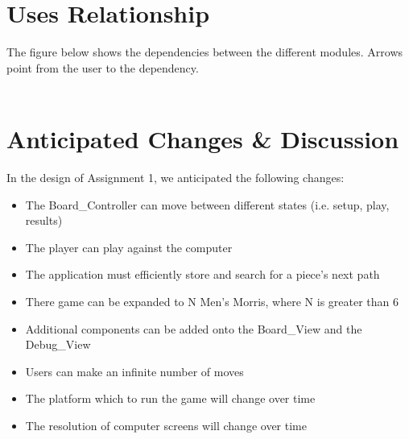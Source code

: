 \documentclass{article}
\begin{document}
{\section{Uses Relationship}
The figure below shows the dependencies between the different modules. Arrows point from the user to the dependency.
\\
\\
\begin{minipage}{\linewidth}
\end{minipage}

\section{Anticipated Changes \& Discussion}
In the design of Assignment 1, we anticipated the following changes:
\begin{itemize}
	\item The Board\_Controller can move between different states (i.e. setup, play, results)
	\item The player can play against the computer
	\item The application must efficiently store and search for a piece's next path
	\item There game can be expanded to N Men's Morris, where N is greater than 6
	\item Additional components can be added onto the Board\_View and the Debug\_View
	\item Users can make an infinite number of moves
	\item The platform which to run the game will change over time
	\item The resolution of computer screens will change over time
\end{itemize}

}
\end{document}
